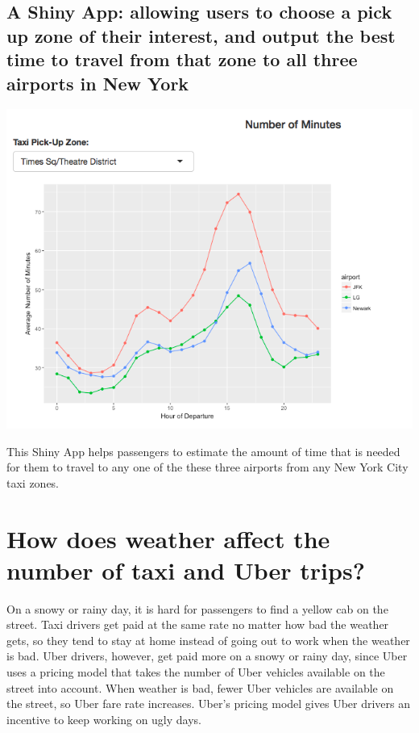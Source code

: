 \documentclass[12pt,twoside]{reedthesis}
\theoremstyle{definition}
\theoremstyle{definition}
\theoremstyle{definition}
\theoremstyle{remark}
\begin{document}
\subsection{A Shiny App: allowing users to choose a pick up zone of
their interest, and output the best time to travel from that zone to all
three airports in New
York}\label{a-shiny-app-allowing-users-to-choose-a-pick-up-zone-of-their-interest-and-output-the-best-time-to-travel-from-that-zone-to-all-three-airports-in-new-york}
\begin{center}\includegraphics[width=6.74in]{figure/shinyapp} \end{center}

This Shiny App helps passengers to estimate the amount of time that is
needed for them to travel to any one of the these three airports from
any New York City taxi zones.

\section{How does weather affect the number of taxi and Uber
trips?}\label{how-does-weather-affect-the-number-of-taxi-and-uber-trips}

On a snowy or rainy day, it is hard for passengers to find a yellow cab
on the street. Taxi drivers get paid at the same rate no matter how bad
the weather gets, so they tend to stay at home instead of going out to
work when the weather is bad. Uber drivers, however, get paid more on a
snowy or rainy day, since Uber uses a pricing model that takes the
number of Uber vehicles available on the street into account. When
weather is bad, fewer Uber vehicles are available on the street, so Uber
fare rate increases. Uber's pricing model gives Uber drivers an
incentive to keep working on ugly days.
\end{document}
